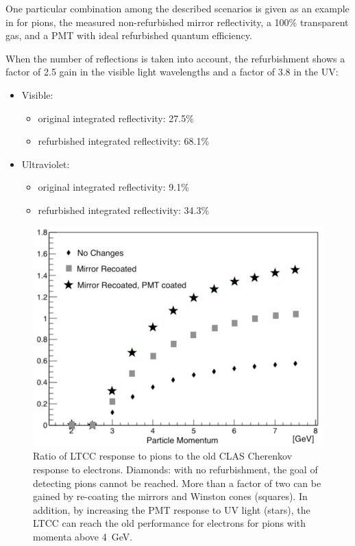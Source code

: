 One particular combination among the described scenarios is given as an example in  for pions,
the measured non-refurbished mirror reflectivity, a 100\% transparent gas, and a PMT with ideal refurbished
quantum efficiency.

When the number of reflections is taken into account, the refurbishment shows a factor of 2.5 gain in the visible
light wavelengths and a factor of 3.8 in the UV:

\begin{itemize}
	\item Visible:
	\begin{itemize}
		\item original integrated reflectivity: 27.5\%
		\item refurbished integrated reflectivity: 68.1\%
	\end{itemize}
	\item Ultraviolet:
	\begin{itemize}
		\item original integrated reflectivity: 9.1\%
		\item refurbished integrated reflectivity: 34.3\%
	\end{itemize}
\end{itemize}

\begin{figure}[htbp]
	\centering
	\includegraphics[width=0.99\columnwidth, height=0.7\columnwidth]{img/refurbishmentGains.png}
	\caption{Ratio of LTCC response to pions to the old CLAS Cherenkov response to electrons. Diamonds: with no
          refurbishment, the goal of detecting pions cannot be reached. More than a factor of two can be gained by
          re-coating the mirrors and Winston cones (squares). In addition, by increasing the PMT response to UV light
          (stars), the LTCC can reach the old performance for electrons for pions with momenta above 4~GeV.}
	\label{fig:refurbishmentGains}
\end{figure}

